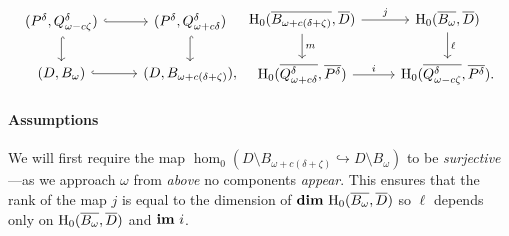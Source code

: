 

\begin{equation}\label{dgm:1}
\begin{tikzcd}
  (P^\of, \Q^\of) \arrow[hookrightarrow]{r}\arrow[hookrightarrow]{d} &
  (P^\of, \QQ^\of) \arrow[hookrightarrow]{d} \\
  (D, \bb) \arrow[hookrightarrow]{r} &
  (D, B_{\omega+c(\delta+\zeta)}),
\end{tikzcd}
\begin{tikzcd}
  \hom_0(\cmp{B_{\omega+c(\delta+\zeta)}},\cmp{D})\arrow{d}{m} \arrow{r}{j} &
  \hom_0(\cmp{\bb}, \cmp{D}) \arrow{d}{\ell} \\
  \hom_0(\cmp{\QQ^\of}, \cmp{P^\of}) \arrow{r}{i} &
  \hom_0(\cmp{\Q^\of}, \cmp{P^\of}).
\end{tikzcd}\end{equation}

\paragraph*{Assumptions}

We will first require the map $\hom_0(D\setminus B_{\omega+c(\delta+\zeta)}\hookrightarrow D\setminus B_\omega)$ to be \emph{surjective}---as we approach $\omega$ from \emph{above} no components \emph{appear}.
This ensures that the rank of the map $j$ is equal to the dimension of $\mathbf{dim}~\mathrm{H}_0(\overline{B_\omega}, \overline{D})$ so $\ell$ depends only on $\mathrm{H}_0(\overline{B_\omega}, \overline{D})$ and $\mathbf{im}~i$.

